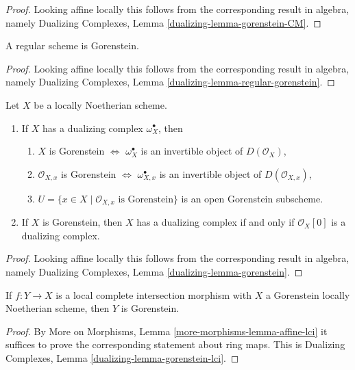 \begin{proof}
Looking affine locally this follows from the corresponding
result in algebra, namely
Dualizing Complexes, Lemma \ref{dualizing-lemma-gorenstein-CM}.
\end{proof}

\begin{lemma}
\label{lemma-regular-gorenstein}
A regular scheme is Gorenstein.
\end{lemma}

\begin{proof}
Looking affine locally this follows from the corresponding
result in algebra, namely
Dualizing Complexes, Lemma \ref{dualizing-lemma-regular-gorenstein}.
\end{proof}

\begin{lemma}
\label{lemma-gorenstein}
Let $X$ be a locally Noetherian scheme.
\begin{enumerate}
\item If $X$ has a dualizing complex $\omega_X^\bullet$, then
\begin{enumerate}
\item $X$ is Gorenstein $\Leftrightarrow$ $\omega_X^\bullet$ is an invertible
object of $D(\mathcal{O}_X)$,
\item $\mathcal{O}_{X, x}$ is Gorenstein $\Leftrightarrow$
$\omega_{X, x}^\bullet$ is an invertible object of $D(\mathcal{O}_{X, x})$,
\item $U = \{x \in X \mid \mathcal{O}_{X, x}\text{ is Gorenstein}\}$
is an open Gorenstein subscheme.
\end{enumerate}
\item If $X$ is Gorenstein, then $X$ has a dualizing complex if and
only if $\mathcal{O}_X[0]$ is a dualizing complex.
\end{enumerate}
\end{lemma}

\begin{proof}
Looking affine locally this follows from the corresponding
result in algebra, namely
Dualizing Complexes, Lemma \ref{dualizing-lemma-gorenstein}.
\end{proof}

\begin{lemma}
\label{lemma-gorenstein-lci}
If $f : Y \to X$ is a local complete intersection morphism
with $X$ a Gorenstein locally Noetherian scheme, then $Y$ is
Gorenstein.
\end{lemma}

\begin{proof}
By More on Morphisms, Lemma \ref{more-morphisms-lemma-affine-lci}
it suffices to prove the corresponding statement about ring maps.
This is Dualizing Complexes, Lemma \ref{dualizing-lemma-gorenstein-lci}.
\end{proof}

